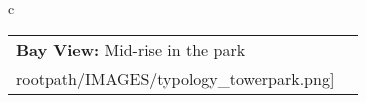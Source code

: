 \begin{table}[H]
        \begin{tabular}{c}
        \begin{tabular}{m{1.5in} m{2in}}
\textbf{Bay View:} {Mid-rise in the park} & \texttt{[image: \\rootpath/IMAGES/typology\_towerpark.png]}
\end{tabular}\end{tabular}
        \end{table}